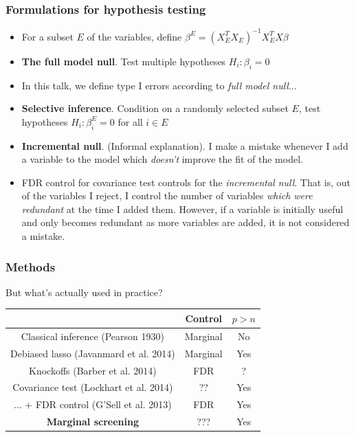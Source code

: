 \documentclass{beamer}
\begin{document}
\begin{frame}
\frametitle{Formulations for hypothesis testing}
\begin{itemize}
\item<1-5> For a subset $E$ of the variables, define $\beta^E = (X_E^T X_E)^{-1} X_E^T X\beta$
\item<2-> \textbf{The full model null}.  Test multiple hypotheses $H_i: \beta_i = 0$
\item<6> In this talk, we define type I errors according to \emph{full model
  null}... 
\item<3> \textbf{Selective inference}.  Condition on a randomly selected subset $E$, test hypotheses $H_i: \beta^E_i = 0$ for all $i \in E$
\item<4-5> \textbf{Incremental null}.  (Informal explanation).  I make
  a mistake whenever I add a variable to the model which
  \emph{doesn't} improve the fit of the model.
\item<5> FDR control for covariance test controls for the
  \emph{incremental null}.  That is, out of the variables I reject, I
  control the number of variables \emph{which were redundant} at the
  time I added them.  However, if a variable is initially useful and
  only becomes redundant as more variables are added, it is not
  considered a mistake.
\end{itemize}
\end{frame}


\begin{frame}
\frametitle{Methods}
But what's actually used in practice?
\begin{center}
\begin{tabular}{|c|c|c|} \hline
 & Control & $p > n$\\ \hline
Classical inference (Pearson 1930) & Marginal & No \\ \hline
Debiased lasso (Javanmard et al. 2014) & Marginal & Yes\\ \hline
Knockoffs (Barber et al. 2014) & FDR & ? \\ \hline
Covariance test (Lockhart et al. 2014) &  ?? & Yes \\
... + FDR control (G'Sell et al. 2013) &  FDR & Yes \\ \hline
\textbf{Marginal screening} & ??? & Yes \\ \hline
\end{tabular}
\end{center}
\end{frame}
\end{document}

